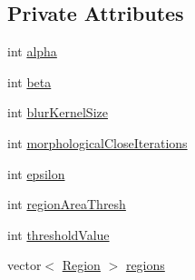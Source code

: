 \subsection*{\-Private \-Attributes}
\begin{DoxyCompactItemize}
\item 
int \hyperlink{classmultiscale_1_1analysis_1_1RegionDetector_ab768a3bbfff9835b441a889ab2cb05a6}{alpha}
\item 
int \hyperlink{classmultiscale_1_1analysis_1_1RegionDetector_a23c831170c2264dd7e59067a1a7d3c8e}{beta}
\item 
int \hyperlink{classmultiscale_1_1analysis_1_1RegionDetector_aae6ee0ec7f0a610dd8a906c1eb181bc7}{blur\-Kernel\-Size}
\item 
int \hyperlink{classmultiscale_1_1analysis_1_1RegionDetector_a700a2f299d7c56fbd1fdbec68092f23a}{morphological\-Close\-Iterations}
\item 
int \hyperlink{classmultiscale_1_1analysis_1_1RegionDetector_acf21910fadd7c6ef2810743a78a0aeb9}{epsilon}
\item 
int \hyperlink{classmultiscale_1_1analysis_1_1RegionDetector_a1f637073a3d946d000dceed01412f19a}{region\-Area\-Thresh}
\item 
int \hyperlink{classmultiscale_1_1analysis_1_1RegionDetector_a0f7469d124c0b906d199e00ea5713007}{threshold\-Value}
\item 
vector$<$ \hyperlink{classmultiscale_1_1analysis_1_1Region}{\-Region} $>$ \hyperlink{classmultiscale_1_1analysis_1_1RegionDetector_aa6517ceb3a58295448d32e6e41499893}{regions}
\end{DoxyCompactItemize}
